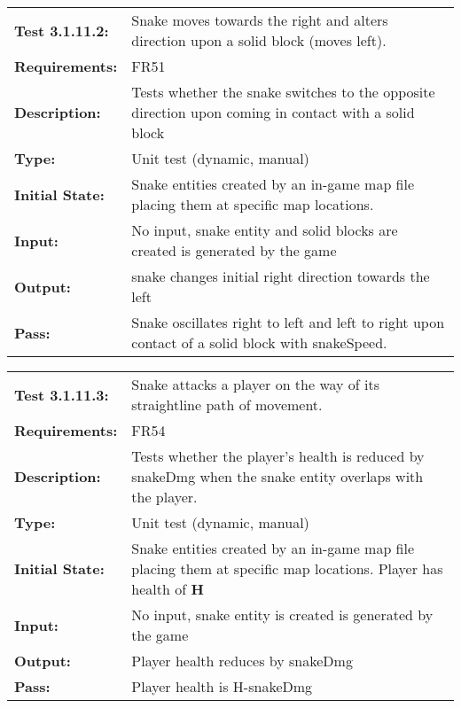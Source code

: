 \documentclass[12pt, titlepage]{article}
\begin{document}
\begin{tabular}{|l|p{10cm}|}
    \hline
    \bf{Test} 3.1.11.2: & Snake moves towards the right and alters direction upon a solid block (moves left).\ \\
     \bf{Requirements}: & FR51 \\
    \bf{Description}: & Tests whether the snake switches to the opposite direction upon coming in contact with a solid block \\
    \bf{Type}:  &  Unit test (dynamic, manual)   \\
    \bf{Initial State}: & Snake entities created by an in-game map file placing them at specific map locations. \\
    \bf{Input}: & No input, snake entity and solid blocks are created is generated by the game \\
    \bf{Output}: & snake changes initial right direction towards the left\\
    \bf{Pass}: & Snake oscillates right to left and left to right upon contact of a solid block with snakeSpeed.\\
    \hline
\end{tabular}

\begin{tabular}{|l|p{10cm}|}
    \hline
    \bf{Test} 3.1.11.3: & Snake attacks a player on the way of its straightline path of movement.\ \\
    \bf{Requirements}: & FR54 \\
    \bf{Description}: & Tests whether the player's health is reduced by snakeDmg when the snake entity overlaps with the player.  \\
    \bf{Type}:  &  Unit test (dynamic, manual)   \\
    \bf{Initial State}: & Snake entities created by an in-game map file placing them at specific map locations. Player has health of $\mathbf{H}$ \\
    \bf{Input}: & No input, snake entity is created is generated by the game \\
    \bf{Output}: & Player health reduces by snakeDmg \\
    \bf{Pass}: & Player health is H-snakeDmg\\
    \hline
\end{tabular}
\end{document}
